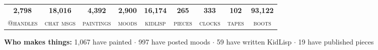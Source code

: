 \documentclass[10pt,letterpaper,twocolumn]{article}
\begin{document}
\begin{center}
\begin{tabular}{ccccccccc}
\toprule
\textbf{\color{acpink}\large 2,798} & \textbf{\color{acpink}\large 18,016} & \textbf{\color{acpink}\large 4,392} & \textbf{\color{acpink}\large 2,900} & \textbf{\color{acpink}\large 16,174} & \textbf{\color{acpink}\large 265} & \textbf{\color{acpink}\large 333} & \textbf{\color{acpink}\large 102} & \textbf{\color{acpink}\large 93,122} \\
{\scriptsize\color{acpurple}\textsc{@handles}} &
{\scriptsize\color{acpurple}\textsc{chat msgs}} &
{\scriptsize\color{acpurple}\textsc{paintings}} &
{\scriptsize\color{acpurple}\textsc{moods}} &
{\scriptsize\color{acpurple}\textsc{kidlisp}} &
{\scriptsize\color{acpurple}\textsc{pieces}} &
{\scriptsize\color{acpurple}\textsc{clocks}} &
{\scriptsize\color{acpurple}\textsc{tapes}} &
{\scriptsize\color{acpurple}\textsc{boots}} \\
\bottomrule
\end{tabular}
\end{center}

\begin{center}
\small\textbf{Who makes things:} 1,067 have painted $\cdot$ 997 have posted moods $\cdot$ 59 have written KidLisp $\cdot$ 19 have published pieces
\end{center}

\vspace{0.3em}
\end{document}
